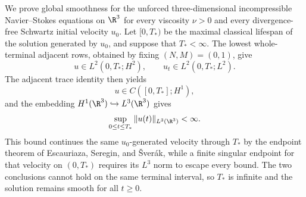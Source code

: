 
We prove global smoothness for the unforced three-dimensional incompressible Navier--Stokes equations on \(\R^3\) for every viscosity \(\nu>0\) and every divergence-free Schwartz initial velocity \(u_0\).
Let \([0,T_*)\) be the maximal classical lifespan of the solution generated by \(u_0\), and suppose that \(T_*<\infty\).
The lowest whole-terminal adjacent rows, obtained by fixing \((N,M)=(0,1)\), give
\[
u\in L^2(0,T_*;H^2),
\qquad
u_t\in L^2(0,T_*;L^2).
\]
The adjacent trace identity then yields
\[
u\in C([0,T_*];H^1),
\]
and the embedding \(H^1(\R^3)\hookrightarrow L^3(\R^3)\) gives
\[
\sup_{0\leq t\leq T_*}\|u(t)\|_{L^3(\R^3)}<\infty.
\]
This bound continues the same \(u_0\)-generated velocity through \(T_*\) by the endpoint theorem of Escauriaza, Seregin, and \v{S}ver\'ak, while a finite singular endpoint for that velocity on \((0,T_*)\) requires its \(L^3\) norm to escape every bound.
The two conclusions cannot hold on the same terminal interval, so \(T_*\) is infinite and the solution remains smooth for all \(t\geq0\).
